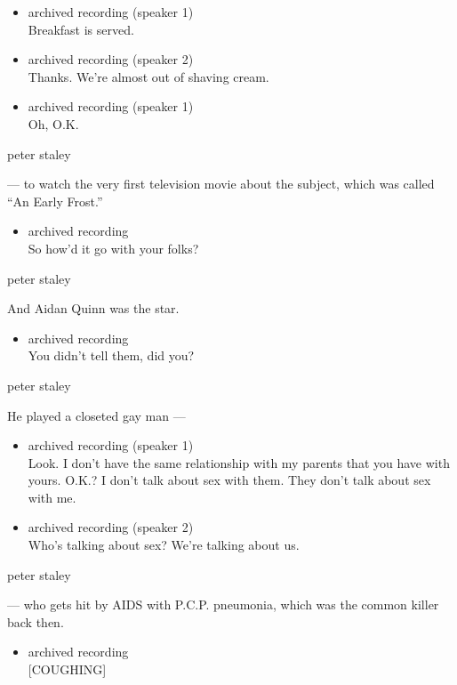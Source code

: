 \begin{itemize}
\item
  archived recording (speaker 1)\\
  Breakfast is served.
\item
  archived recording (speaker 2)\\
  Thanks. We're almost out of shaving cream.
\item
  archived recording (speaker 1)\\
  Oh, O.K.
\end{itemize}

peter staley

--- to watch the very first television movie about the subject, which
was called ``An Early Frost.''

\begin{itemize}
\tightlist
\item
  archived recording\\
  So how'd it go with your folks?
\end{itemize}

peter staley

And Aidan Quinn was the star.

\begin{itemize}
\tightlist
\item
  archived recording\\
  You didn't tell them, did you?
\end{itemize}

peter staley

He played a closeted gay man ---

\begin{itemize}
\item
  archived recording (speaker 1)\\
  Look. I don't have the same relationship with my parents that you have
  with yours. O.K.? I don't talk about sex with them. They don't talk
  about sex with me.
\item
  archived recording (speaker 2)\\
  Who's talking about sex? We're talking about us.
\end{itemize}

peter staley

--- who gets hit by AIDS with P.C.P. pneumonia, which was the common
killer back then.

\begin{itemize}
\tightlist
\item
  archived recording\\
  {[}COUGHING{]}
\end{itemize}

